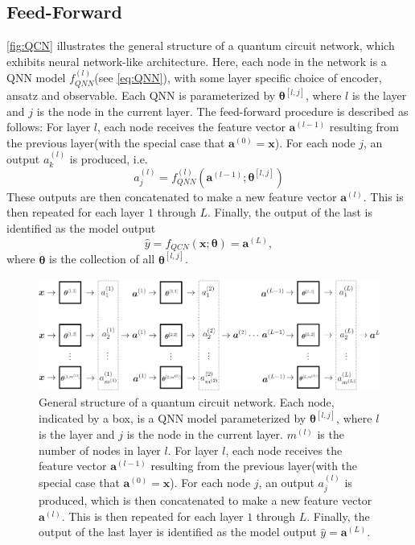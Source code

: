 \subsection{Feed-Forward}\label{sec:FeedForward}
\autoref{fig:QCN} illustrates the general structure of a quantum circuit network, which exhibits neural network-like architecture. Here, each node in the network is a QNN model $f^{(l)}_{QNN}$(see \autoref{eq:QNN}), with some layer specific choice of encoder, ansatz and observable. Each QNN is parameterized by $\boldsymbol{\theta}^{[l,j]}$, where $l$ is the layer and $j$ is the node in the current layer. The feed-forward procedure is described as follows: 
For layer $l$, each node receives the feature vector $\boldsymbol{a}^{(l-1)}$ resulting from the previous layer(with the special case that $\boldsymbol{a}^{(0)} = \boldsymbol{x}$). For each node $j$, an output $a^{(l)}_k$ is produced, i.e.
\begin{equation}
    a^{(l)}_j = f^{(l)}_{QNN}(\boldsymbol{a}^{(l-1)}; \boldsymbol{\theta}^{[l,j]})
\end{equation}
These outputs are then concatenated to make a new feature vector $\boldsymbol{a}^{(l)}$. This is then repeated for each layer $1$ through $L$. Finally, the output of the last is identified as the model output
\begin{equation}\label{eq:QCN}
    \hat{y} = f_{QCN}(\boldsymbol{x}; \boldsymbol{\theta}) = \boldsymbol{a}^{(L)},
\end{equation}
where $\boldsymbol{\theta}$ is the collection of all $\boldsymbol{\theta}^{[l,j]}$.


\begin{figure}[htp]
    \centering
    \includegraphics[width = 15cm]{latex/figures/QCN.png}
    \caption{General structure of a quantum circuit network. Each node, indicated by a box, is a QNN model parameterized by $\boldsymbol{\theta}^{[l,j]}$, where $l$ is the layer and $j$ is the node in the current layer. $m^{(l)}$ is the number of nodes in layer $l$. For layer $l$, each node receives the feature vector $\boldsymbol{a}^{(l-1)}$ resulting from the previous layer(with the special case that $\boldsymbol{a}^{(0)} = \boldsymbol{x}$). For each node $j$, an output $a^{(l)}_j$ is produced, which is then concatenated to make a new feature vector $\boldsymbol{a}^{(l)}$. This is then repeated for each layer $1$ through $L$. Finally, the output of the last layer is identified as the model output $\hat{y} = \boldsymbol{a}^{(L)}$.}
    \label{fig:QCN}
\end{figure}

